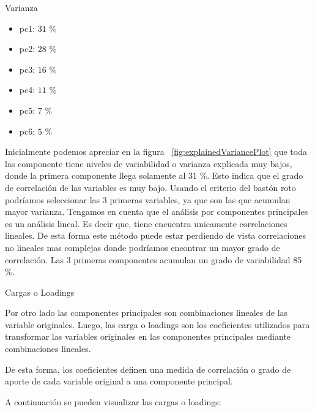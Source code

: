\documentclass[11pt,a4paper,twoside]{thesis}
\begin{document}
\begin{description}
	\item[Varianza]
\end{description}
\begin{itemize}
	\item pc1: $31$ \%
	\item pc2: $28$ \%
	\item pc3: $16$ \%
	\item pc4: $11$ \%
	\item pc5: $7$ \%
	\item pc6: $5$ \%
\end{itemize}

Inicialmente podemos apreciar en la figura ~\ref{fig:explainedVariancePlot} que
toda las componente tiene niveles de variabilidad o varianza explicada muy
bajos, donde la primera componente llega solamente al $31$ \%. Esto indica que
el grado de correlación de las variables es muy bajo. Usando el criterio del
bastón roto podríamos seleccionar las 3 primeras variables, ya que son las que
acumulan mayor varianza. Tengamos en cuenta que el análisis por componentes
principales es un análisis lineal. Es decir que, tiene encuentra unicamente
correlaciones lineales. De esta forma este método puede estar perdiendo de
vista correlaciones no lineales mas complejas donde podríamos encontrar un
mayor grado de correlación. Las 3 primeras componentes acumulan un grado de
variabilidad 85 \%.

\begin{description}
	\item[Cargas o Loadings]
\end{description}

Por otro lado las componentes principales son combinaciones lineales de las
variable originales. Luego, las carga o loadings son los coeficientes
utilizados para transformar las variables originales en las componentes
principales mediante combinaciones lineales.

De esta forma, los coeficientes definen una medida de correlación o grado de
aporte de cada variable original a una componente principal.

A continuación se pueden visualizar las cargas o loadings:
\end{document}
